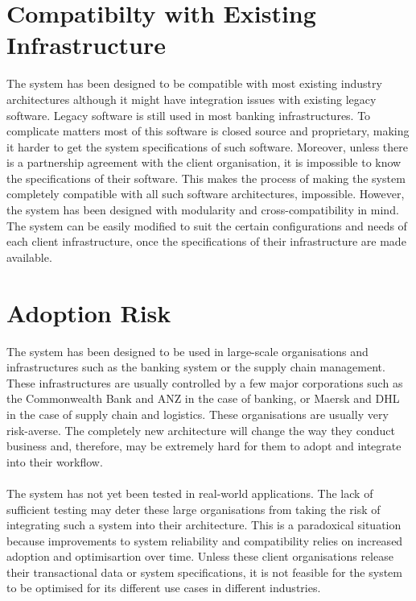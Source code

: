 \documentclass[a4paper,twoside,phd]{BYUPhys}
\begin{document}
\section{Compatibilty with Existing Infrastructure}
The system has been designed to be compatible with most existing industry architectures although it might have integration issues with existing legacy software\cite{JohnLamb2008LegacyEnterprise}. Legacy software is still used in most banking infrastructures\cite{JohnLamb2008LegacyEnterprise}. To complicate matters most of this software is closed source and proprietary, making it harder to get the system specifications of such software. Moreover, unless there is a partnership agreement with the client organisation, it is impossible to know the specifications of their software. This makes the process of making the system completely compatible with all such software architectures, impossible. However, the system has been designed with modularity and cross-compatibility in mind. The system can be easily modified to suit the certain configurations and needs of each client infrastructure, once the specifications of their infrastructure are made available.
\section{Adoption Risk}
The system has been designed to be used in large-scale organisations and infrastructures such as the banking system or the supply chain management. These infrastructures are usually controlled by a few major corporations such as the Commonwealth Bank and ANZ in the case of banking, or Maersk and DHL in the case of supply chain and logistics. These organisations are usually very risk-averse\cite{Gorter2011DNBInvestors}. The completely new architecture will change the way they conduct business and, therefore, may be extremely hard for them to adopt and integrate into their workflow.
\\
\\
The system has not yet been tested in real-world applications. The lack of sufficient testing may deter these large organisations from taking the risk of integrating such a system into their architecture. This is a paradoxical situation because improvements to system reliability and compatibility relies on increased adoption and optimisartion over time. Unless these client organisations release their transactional data or system specifications, it is not feasible for the system to be optimised for its different use cases in different industries.
\end{document}
